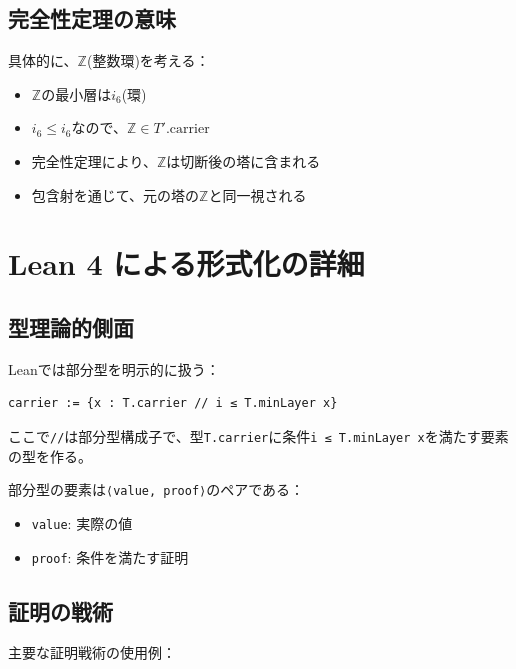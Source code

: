 \documentclass[a4paper,11pt]{article}
\theoremstyle{definition}
\begin{document}
\subsection{完全性定理の意味}

具体的に、$\mathbb{Z}$(整数環)を考える：
\begin{itemize}
    \item $\mathbb{Z}$の最小層は$i_6$(環)
    \item $i_6 \leq i_6$なので、$\mathbb{Z} \in T'.\text{carrier}$
    \item 完全性定理により、$\mathbb{Z}$は切断後の塔に含まれる
    \item 包含射を通じて、元の塔の$\mathbb{Z}$と同一視される
\end{itemize}

\section{Lean 4 による形式化の詳細}

\subsection{型理論的側面}

Leanでは部分型を明示的に扱う：

\begin{verbatim}
carrier := {x : T.carrier // i ≤ T.minLayer x}
\end{verbatim}

ここで\texttt{//}は部分型構成子で、型\texttt{T.carrier}に条件\texttt{i ≤ T.minLayer x}を満たす要素の型を作る。

部分型の要素は\texttt{⟨value, proof⟩}のペアである：
\begin{itemize}
    \item \texttt{value}: 実際の値
    \item \texttt{proof}: 条件を満たす証明
\end{itemize}

\subsection{証明の戦術}

主要な証明戦術の使用例：
\end{document}

